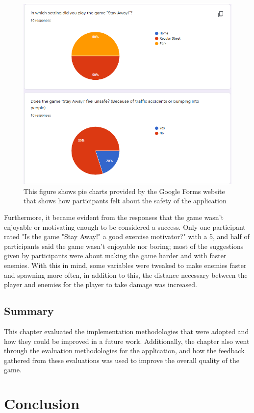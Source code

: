 \documentclass{dissertation}
\begin{document}
\begin{figure}[H]
\centering
\includegraphics[width = 12cm]{images/unsafe-chart.png}
\caption{This figure shows pie charts provided by the Google Forms website that shows how participants felt about the safety of the application}
\label{fig:unsafe-chart}
\end{figure}

Furthermore, it became evident from the responses that the game wasn't enjoyable or motivating enough to be considered a success. Only one participant rated "Is the game "Stay Away!" a good exercise motivator?" with a 5, and half of participants said the game wasn't enjoyable nor boring; most of the suggestions given by participants were about making the game harder and with faster enemies. With this in mind, some variables were tweaked to make enemies faster and spawning more often, in addition to this, the distance necessary between the player and enemies for the player to take damage was increased.

\section{Summary}
This chapter evaluated the implementation methodologies that were adopted and how they could be improved in a future work. Additionally, the chapter also went through the evaluation methodologies for the application, and how the feedback gathered from these evaluations was used to improve the overall quality of the game.

\chapter{Conclusion}
\end{document}
